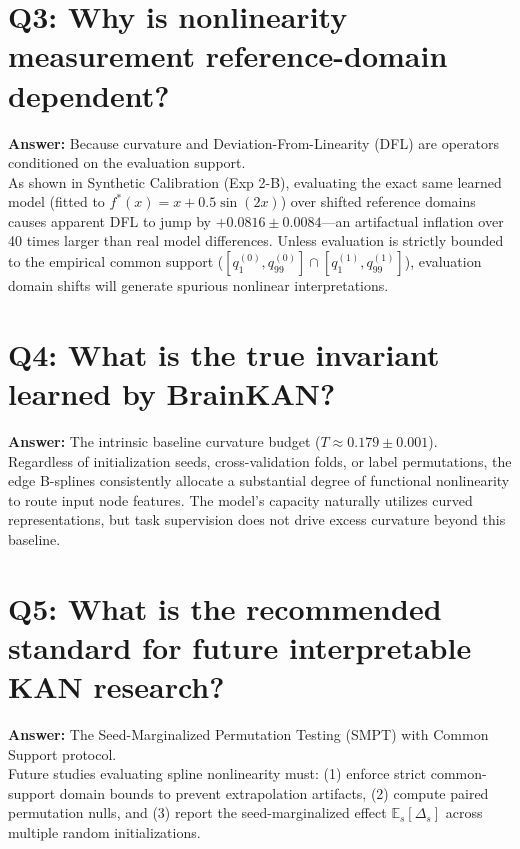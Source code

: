 \documentclass{article}
\begin{document}
\section*{Q3: Why is nonlinearity measurement reference-domain dependent?}
\textbf{Answer:} Because curvature and Deviation-From-Linearity (DFL) are operators conditioned on the evaluation support. \\
As shown in Synthetic Calibration (Exp 2-B), evaluating the exact same learned model (fitted to $f^*(x) = x + 0.5\sin(2x)$) over shifted reference domains causes apparent DFL to jump by $+0.0816 \pm 0.0084$—an artifactual inflation over 40 times larger than real model differences. Unless evaluation is strictly bounded to the empirical common support ($[q_1^{(0)}, q_{99}^{(0)}] \cap [q_1^{(1)}, q_{99}^{(1)}]$), evaluation domain shifts will generate spurious nonlinear interpretations.

\section*{Q4: What is the true invariant learned by BrainKAN?}
\textbf{Answer:} The intrinsic baseline curvature budget ($T \approx 0.179 \pm 0.001$). \\
Regardless of initialization seeds, cross-validation folds, or label permutations, the edge B-splines consistently allocate a substantial degree of functional nonlinearity to route input node features. The model's capacity naturally utilizes curved representations, but task supervision does not drive excess curvature beyond this baseline.

\section*{Q5: What is the recommended standard for future interpretable KAN research?}
\textbf{Answer:} The Seed-Marginalized Permutation Testing (SMPT) with Common Support protocol. \\
Future studies evaluating spline nonlinearity must: (1) enforce strict common-support domain bounds to prevent extrapolation artifacts, (2) compute paired permutation nulls, and (3) report the seed-marginalized effect $\mathbb{E}_s[\Delta_s]$ across multiple random initializations.
\end{document}
